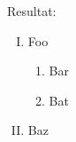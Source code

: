 \noindent Resultat:
\begin{enumerate}[I.]
    \item Foo
    \begin{enumerate}[a =]
        \item Bar
        \item Bat
    \end{enumerate}
    \item Baz
\end{enumerate}
